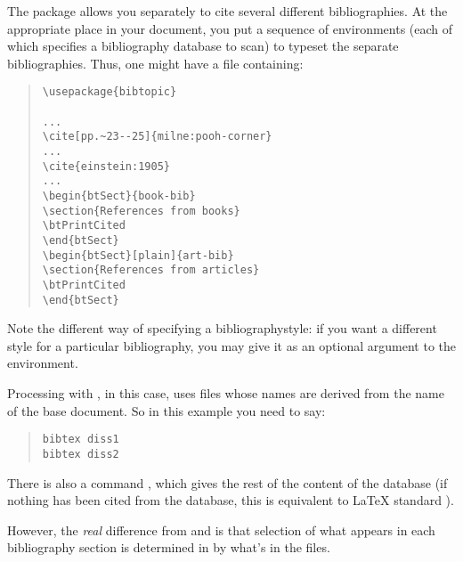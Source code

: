 The  package allows you separately to cite several
different bibliographies.  At the appropriate place in your document,
you put a sequence of  environments (each of which
specifies a bibliography database to scan) to typeset the separate
bibliographies.  Thus, one might have a file  containing:
\begin{quote}
\begin{verbatim}
\usepackage{bibtopic}

...
\cite[pp.~23--25]{milne:pooh-corner}
...
\cite{einstein:1905}
...
\begin{btSect}{book-bib}
\section{References from books}
\btPrintCited
\end{btSect}
\begin{btSect}[plain]{art-bib}
\section{References from articles}
\btPrintCited
\end{btSect}
\end{verbatim}
\end{quote}
Note the different way of specifying a bibliographystyle: if you want
a different style for a particular bibliography, you may give it as an
optional argument to the  environment.

Processing with \BibTeX{}, in this case, uses  files whose names
are derived from the name of the base document.  So in this example
you need to say:
\begin{quote}
\begin{verbatim}
bibtex diss1
bibtex diss2
\end{verbatim}
\end{quote}

There is also a command , which gives the rest of
the content of the database (if nothing has been cited from the
database, this is equivalent to \LaTeX{} standard ).

However, the \emph{real} difference from  and
 is that selection of what appears in each
bibliography section is determined in  by what's in
the  files.

